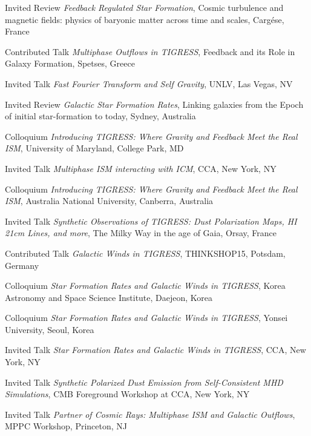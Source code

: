\documentclass[12pt]{article}
\begin{document}
{Invited Review}
{\emph{Feedback Regulated Star Formation},
Cosmic turbulence and magnetic fields: physics of baryonic matter across time and scales,
Carg\'ese, France}

{Contributed Talk}
{\emph{Multiphase Outflows in TIGRESS},
Feedback and its Role in Galaxy Formation,
Spetses, Greece}

{Invited Talk}
{\emph{Fast Fourier Transform and Self Gravity},
UNLV,
Las Vegas, NV}

{Invited Review}
{\emph{Galactic Star Formation Rates},
Linking galaxies from the Epoch of initial star-formation to today,
Sydney, Australia}

{Colloquium}
{\emph{Introducing TIGRESS: Where Gravity and Feedback Meet the Real ISM},
University of Maryland,
College Park, MD}

{Invited Talk}
{\emph{Multiphase ISM interacting with ICM},
CCA,
New York, NY}

{Colloquium}
{\emph{Introducing TIGRESS: Where Gravity and Feedback Meet the Real ISM},
Australia National University,
Canberra, Australia}

{Invited Talk}
{\emph{Synthetic Observations of TIGRESS: Dust Polarization Maps, HI 21cm Lines, and more},
The Milky Way in the age of Gaia,
Orsay, France}

{Contributed Talk}
{\emph{Galactic Winds in TIGRESS},
THINKSHOP15,
Potsdam, Germany}

{Colloquium}
{\emph{Star Formation Rates and Galactic Winds in TIGRESS},
Korea Astronomy and Space Science Institute,
Daejeon, Korea}

{Colloquium}
{\emph{Star Formation Rates and Galactic Winds in TIGRESS},
Yonsei University,
Seoul, Korea}

{Invited Talk}
{\emph{Star Formation Rates and Galactic Winds in TIGRESS},
CCA,
New York, NY}

{Invited Talk}
{\emph{Synthetic Polarized Dust Emission from Self-Consistent MHD Simulations},
CMB Foreground Workshop at CCA,
New York, NY}

{Invited Talk}
{\emph{Partner of Cosmic Rays: Multiphase ISM and Galactic Outflows},
MPPC Workshop,
Princeton, NJ}
\end{document}
